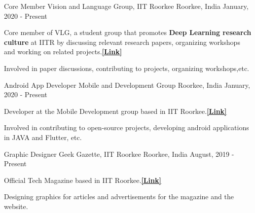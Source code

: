 

\begin{cventries}

  \cventry
    {Core Member} %
    {Vision and Language Group, IIT Roorkee} %
    {Roorkee, India} %
    {January, 2020 - Present} %
    {
      \begin{cvitems} %
        \item {Core member of VLG, a student group that promotes \textbf{Deep Learning research culture} at IITR by discussing relevant research papers, organizing workshops and working on related projects.\href{https://vlgiitr.github.io/}{\bf [Link]}}
        \item {Involved in paper discussions, contributing to projects, organizing workshops,etc.}
      \end{cvitems}
    }

  \cventry
    {Android App Developer} %
    {Mobile and Development Group} %
    {Roorkee, India} %
    {January, 2020 - Present} %
    {
      \begin{cvitems} %
        \item {Developer at the Mobile Development group based in IIT Roorkee.\href{https://mdg.iitr.ac.in/}{\bf [Link]}}
        \item{Involved in contributing to open-source projects, developing android applications in JAVA and Flutter, etc.}
      \end{cvitems}
    }

  \cventry
    {Graphic Designer} %
    {Geek Gazette, IIT Roorkee} %
    {Roorkee, India} %
    {August, 2019 - Present} %
    {
      \begin{cvitems} %
        \item {Official Tech Magazine based in IIT Roorkee.\href{https://geekgazette.org/}{\bf [Link]}}
        \item {Designing graphics for articles and advertisements for  the magazine and the website.}
      \end{cvitems}
    }

\end{cventries}
